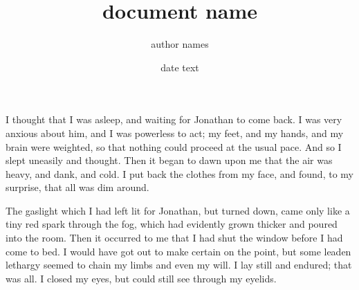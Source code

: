 \documentclass[12pt,a5paper,twocolumn,twoside,openright,titlepage]{book}
\title{document name}
\author{author names}
\date{date text}
\begin{document}
\maketitle

\pagestyle{headings}


\setlength{\textwidth}{11cm}

\setcounter{page}{257}

I thought that I was asleep, and waiting for Jonathan to come back.
I was very anxious about him, and I was powerless to act; my feet,
and my hands, and my brain were weighted, so that nothing could proceed
at the usual pace. And so I slept uneasily and thought. Then it began to
dawn upon me that the air was heavy, and dank, and cold. I put back the
clothes from my face, and found, to my surprise, that all was dim around.

The gaslight which I had left lit for Jonathan, but turned down, came only
like a tiny red spark through the fog, which had evidently grown thicker and
poured into the room. Then it occurred to me that I had shut the window before
I had come to bed. I would have got out to make certain on the point, but some
leaden lethargy seemed to chain my limbs and even my will. I lay still and endured;
that was all. I closed my eyes, but could still see through my eyelids.
\end{document}
